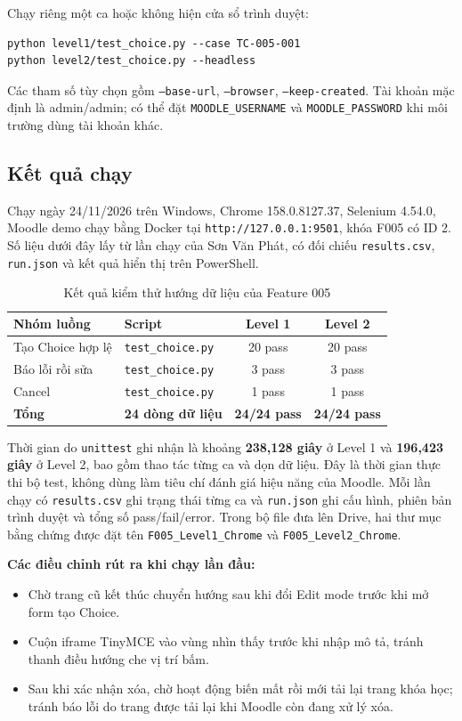 \documentclass[12pt,a4paper]{article}
\begin{document}
Chạy riêng một ca hoặc không hiện cửa sổ trình duyệt:
\begin{lstlisting}
python level1/test_choice.py --case TC-005-001
python level2/test_choice.py --headless
\end{lstlisting}
Các tham số tùy chọn gồm \texttt{--base-url}, \texttt{--browser}, \texttt{--keep-created}.
Tài khoản mặc định là admin/admin; có thể đặt \texttt{MOODLE\_USERNAME} và
\texttt{MOODLE\_PASSWORD} khi môi trường dùng tài khoản khác.

\subsection{Kết quả chạy}
Chạy ngày 24/11/2026 trên Windows, Chrome 158.0.8127.37, Selenium 4.54.0,
Moodle demo chạy bằng Docker tại \texttt{http://127.0.0.1:9501}, khóa F005 có ID 2.
Số liệu dưới đây lấy từ lần chạy của Sơn Văn Phát, có đối chiếu \texttt{results.csv},
\texttt{run.json} và kết quả hiển thị trên PowerShell.

\begin{table}[H]
\centering\small
\begin{tabular}{|L{4.7cm}|L{3.5cm}|c|c|}
\hline
{}\textbf{Nhóm luồng} & \textbf{Script} & \textbf{Level 1} & \textbf{Level 2} \\ \hline
Tạo Choice hợp lệ & \texttt{test\_choice.py} & 20 pass & 20 pass \\ \hline
Báo lỗi rồi sửa & \texttt{test\_choice.py} & 3 pass & 3 pass \\ \hline
Cancel & \texttt{test\_choice.py} & 1 pass & 1 pass \\ \hline
\textbf{Tổng} & \textbf{24 dòng dữ liệu} & \textbf{24/24 pass} & \textbf{24/24 pass} \\ \hline
\end{tabular}
\caption{Kết quả kiểm thử hướng dữ liệu của Feature 005}
\end{table}

Thời gian do \texttt{unittest} ghi nhận là khoảng \textbf{238,128 giây} ở Level 1 và
\textbf{196,423 giây} ở Level 2, bao gồm thao tác từng ca và dọn dữ liệu. Đây là thời gian thực thi
bộ test, không dùng làm tiêu chí đánh giá hiệu năng của Moodle.
Mỗi lần chạy có \texttt{results.csv} ghi trạng thái từng ca và \texttt{run.json} ghi cấu hình,
phiên bản trình duyệt và tổng số pass/fail/error. Trong bộ file đưa lên Drive, hai thư mục
bằng chứng được đặt tên \texttt{F005\_Level1\_Chrome} và \texttt{F005\_Level2\_Chrome}.

\textbf{Các điều chỉnh rút ra khi chạy lần đầu:}
\begin{itemize}[noitemsep]
  \item Chờ trang cũ kết thúc chuyển hướng sau khi đổi Edit mode trước khi mở form tạo Choice.
  \item Cuộn iframe TinyMCE vào vùng nhìn thấy trước khi nhập mô tả, tránh thanh điều hướng che vị trí bấm.
  \item Sau khi xác nhận xóa, chờ hoạt động biến mất rồi mới tải lại trang khóa học; tránh báo lỗi
        do trang được tải lại khi Moodle còn đang xử lý xóa.
\end{itemize}
\end{document}
